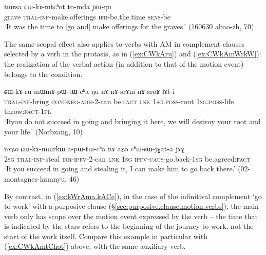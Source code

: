 \begin{exe}
\ex \label{ex:CWkAmtChot}
\gll tɯrsa ɕɯ-kɤ-mtɕʰot to-mda ɲɯ-ŋu \\
grave \textsc{tral}-\textsc{inf}-make.offerings \textsc{ifr}-be.the.time \textsc{sens}-be \\
\glt `It was the time to [go and] make offerings for the graves.' (160630 abao-zh, 70)
 \end{exe} 
 
The same scopal effect also applies to  verbs with AM in complement clauses selected by a verb in the protasis, as in (\ref{ex:CWkAru}) and (\ref{ex:CWkAmWrkW}): the realization of the verbal action (in addition to that of the motion event) belongs to the condition.

\begin{exe}
\ex \label{ex:CWkAru}
\gll ɕɯ-kɤ-ru mɯ\redp{}mɤ-pɯ-tɯ-cʰa ŋu nɤ nɤ-srɤm nɤ-sroʁ lɤt-i \\
\textsc{tral}-\textsc{inf}-bring \textsc{cond}\redp{}\textsc{neg}-\textsc{aor}-2-can be:\textsc{fact} \textsc{lnk} \textsc{1sg}.\textsc{poss}-root \textsc{1sg}.\textsc{poss}-life throw:\textsc{fact}-\textsc{1pl} \\ 
\glt `Ifyou do not succeed in going and bringing it here, we will destroy your root and your life.' (Norbzang, 10)
\end{exe}

\begin{exe}
\ex \label{ex:CWkAmWrkW}
\gll nɤʑo ɕɯ-kɤ-mɯrkɯ a-pɯ-tɯ-cʰa nɤ aʑo cʰɯ-sɯ-jɣat-a jɤɣ \\
\textsc{2sg} \textsc{tral}-\textsc{inf}-steal \textsc{irr}-\textsc{ipfv}-2-can \textsc{lnk} \textsc{1sg} \textsc{ipfv}-\textsc{caus}-go.back-\textsc{1sg} be.agreed:\textsc{fact} \\
\glt `If you succeed in going and stealing it, I can make him to go back there.' (02-montagnes-kamnyu, 46)
\end{exe}

 
By contrast, in  (\ref{ex:kWrAma.kACe}), in the case of the infinitival complement  `go to work' with a purposive clause  (§\ref{sec:purposive.clause.motion.verbs}), the main verb  only has scope over the motion event expressed by the verb  -- the time that is indicated by the stars refers to the beginning of the journey to work, not the start of the work itself. Compare this example in particular with (\ref{ex:CWkAmtChot}) above, with the same auxiliary verb.
 
